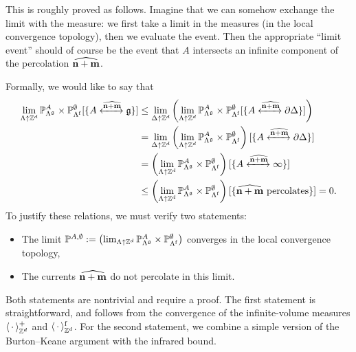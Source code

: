 This is roughly proved as follows.
Imagine that we can somehow exchange the limit with the measure:
we first take a limit in the measures (in the local convergence topology),
then we evaluate the event.
Then the appropriate ``limit event'' should of course be the event that
$A$ intersects an infinite component of the percolation $\widehat{\mathbf{n}+\mathbf{m}}$.

Formally, we would like to say that
\begin{align}
    \lim_{\Lambda\uparrow\Z^d}
    \P_{\Lambda^\frakg}^A\times\P_{\Lambda^\f}^\emptyset
    [\{A \xleftrightarrow{\widehat{\n+\m}}\frakg\}]
    &
    \leq
    \lim_{\Delta\uparrow\Z^d}
    \left(
    \lim_{\Lambda\uparrow\Z^d}
    \P_{\Lambda^\frakg}^A\times\P_{\Lambda^\f}^\emptyset
    [\{A \xleftrightarrow{\widehat{\n+\m}}\partial\Delta\}]
    \right) 
    \\&
    =
    \lim_{\Delta\uparrow\Z^d}
    \left(
    \lim_{\Lambda\uparrow\Z^d}
    \P_{\Lambda^\frakg}^A\times\P_{\Lambda^\f}^\emptyset
    \right)
    [\{A \xleftrightarrow{\widehat{\n+\m}}\partial\Delta\}]
    \\&
    =
    \left(
    \lim_{\Lambda\uparrow\Z^d}
    \P_{\Lambda^\frakg}^A\times\P_{\Lambda^\f}^\emptyset
    \right)
    [\{A \xleftrightarrow{\widehat{\n+\m}}\infty\}]
    \\&\leq
    \left(
    \lim_{\Lambda\uparrow\Z^d}
    \P_{\Lambda^\frakg}^A\times\P_{\Lambda^\f}^\emptyset
    \right)
    [\{\text{$\widehat{\n+\m}$ percolates}\}]=0.
\end{align}
To justify these relations, we must verify two statements:
\begin{itemize}
    \item The limit $\mathbb P^{A,\emptyset}:=\left(
        \lim_{\Lambda\uparrow\mathbb Z^d}
        \mathbb P_{\Lambda^\mathfrak g}^A\times\mathbb P_{\Lambda^{\operatorname{f}}}^\emptyset\right)
        $ converges in the local convergence topology,
    \item The currents $\widehat{\mathbf{n}+\mathbf{m}}$ do not percolate in this limit.
\end{itemize}

Both statements are nontrivial and require a proof.
The first statement is straightforward, and follows
from the convergence of the infinite-volume measures $\langle\,\cdot\,\rangle^+_{\mathbb Z^d}$
and $\langle\,\cdot\,\rangle^{\operatorname{f}}_{\mathbb Z^d}$.
For the second statement, we combine a simple version of the Burton--Keane argument
with the infrared bound.


